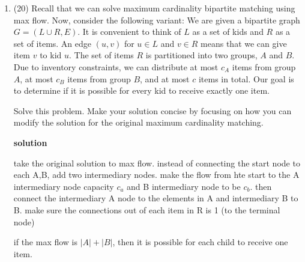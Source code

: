 \documentclass[letterpaper,12pt]{article}
\begin{document}
\begin{enumerate}
thus we want \(\frac{W-w_j}{W} = \) probability of survival. 

\begin{equation}
    \frac{W-w_j}{W} = 1-\left( \frac{kw_i}{W} \cdot a \right)
\end{equation}

where a is the probability of eviction given that an element is choosen to replace an element in R.

\begin{equation}
    a = \frac{w_j}{kw_i}
\end{equation}


i used chat gpt to explain the original algorithm




\newpage
\item (20) 
Recall that we can solve maximum cardinality bipartite matching using max flow. Now, consider the following variant: We are given a bipartite graph $G = (L \cup R, E)$. It is convenient to think of $L$ as a set of kids and $R$ as a set of items. An edge $(u, v)$ for $u \in L$ and $v \in R$ means that we can give item $v$ to kid $u$. The set of items $R$ is partitioned into two groups, $A$ and $B$. Due to inventory constraints, we can distribute at most $c_A$ items from group $A$, at most $c_B$ items from group $B$, and at most $c$ items in total. Our goal is to determine if it is possible for every kid to receive exactly one item.

Solve this problem. Make your solution concise by focusing on how you can modify the solution for the original maximum cardinality matching. 

\textbf{solution}

take the original solution to max flow. instead of connecting the start node to each A,B, add two intermediary nodes. make the flow from hte start to the A intermediary node capacity \(c_a\) and B intermediary node to be \(c_b\). then connect the intermediary A node to the elements in A and intermediary B to B. make sure the connections out of each item in R is 1 (to the terminal node)


if the max flow is \(|A|+|B|\), then it is possible for each child to receive one item. 


\end{enumerate}
\end{document}
